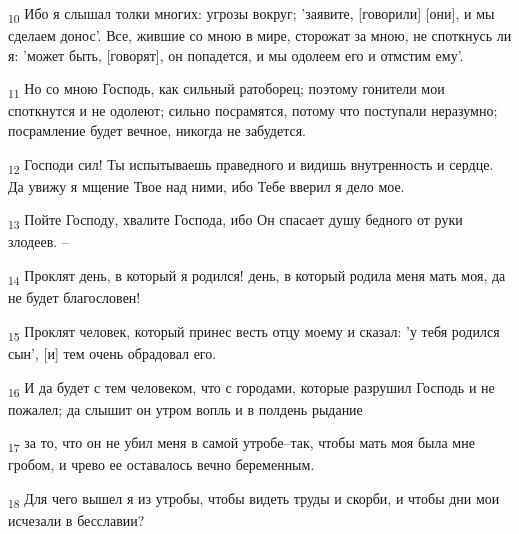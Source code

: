 \begin{tcolorbox}
\textsubscript{10} Ибо я слышал толки многих: угрозы вокруг; 'заявите, [говорили] [они], и мы сделаем донос'. Все, жившие со мною в мире, сторожат за мною, не споткнусь ли я: 'может быть, [говорят], он попадется, и мы одолеем его и отмстим ему'.
\end{tcolorbox}
\begin{tcolorbox}
\textsubscript{11} Но со мною Господь, как сильный ратоборец; поэтому гонители мои споткнутся и не одолеют; сильно посрамятся, потому что поступали неразумно; посрамление будет вечное, никогда не забудется.
\end{tcolorbox}
\begin{tcolorbox}
\textsubscript{12} Господи сил! Ты испытываешь праведного и видишь внутренность и сердце. Да увижу я мщение Твое над ними, ибо Тебе вверил я дело мое.
\end{tcolorbox}
\begin{tcolorbox}
\textsubscript{13} Пойте Господу, хвалите Господа, ибо Он спасает душу бедного от руки злодеев. --
\end{tcolorbox}
\begin{tcolorbox}
\textsubscript{14} Проклят день, в который я родился! день, в который родила меня мать моя, да не будет благословен!
\end{tcolorbox}
\begin{tcolorbox}
\textsubscript{15} Проклят человек, который принес весть отцу моему и сказал: 'у тебя родился сын', [и] тем очень обрадовал его.
\end{tcolorbox}
\begin{tcolorbox}
\textsubscript{16} И да будет с тем человеком, что с городами, которые разрушил Господь и не пожалел; да слышит он утром вопль и в полдень рыдание
\end{tcolorbox}
\begin{tcolorbox}
\textsubscript{17} за то, что он не убил меня в самой утробе--так, чтобы мать моя была мне гробом, и чрево ее оставалось вечно беременным.
\end{tcolorbox}
\begin{tcolorbox}
\textsubscript{18} Для чего вышел я из утробы, чтобы видеть труды и скорби, и чтобы дни мои исчезали в бесславии?
\end{tcolorbox}
